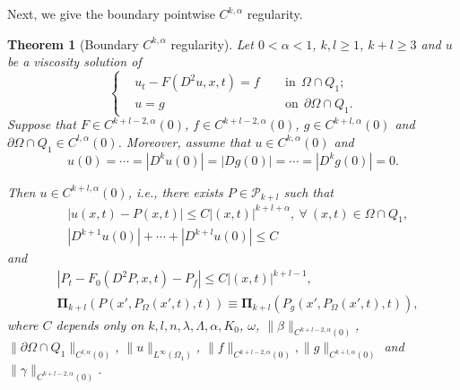 \documentclass[preprint,12pt]{elsarticle}
\newtheorem{theorem}{Theorem}[section]
\theoremstyle{definition}
\theoremstyle{remark}
\numberwithin{equation}{section}
\begin{document}
Next, we give the boundary pointwise $C^{k,\alpha}$ regularity.

\begin{theorem}[Boundary $C^{k,\alpha}$ regularity]\label{Ckla}
Let $0<\alpha<1$, $k,l\geq 1$, $k+l\geq 3$ and $u$ be a viscosity solution of
\begin{equation}\label{e.Ckla.1}
 \left\{ \begin{aligned}
&u_t-F(D^2 u,x,t)=f ~~&&\mbox{in}~~\Omega\cap Q_1;\\
&u=g ~~&&\mbox{on}~~\partial \Omega\cap Q_1.
 \end{aligned}\right.
\end{equation}
Suppose that $F\in C^{k+l-2,\alpha}(0)$, $f\in C^{k+l-2,\alpha}(0)$, $g\in C^{k+l,\alpha}(0)$ and $\partial \Omega\cap Q_1\in C^{l,\alpha}(0)$. Moreover, assume that $u\in C^{k,\alpha}(0)$ and
\begin{equation*}
u(0)=\cdots=|D^ku(0)|=|Dg(0)|=\cdots=|D^kg(0)|=0.
\end{equation*}

Then $u\in C^{k+l,\alpha}(0)$, i.e., there exists $P\in \mathcal{P}_{k+l}$ such that
\begin{equation*}
  \begin{aligned}
&|u(x,t)-P(x,t)|\leq C |(x,t)|^{k+l+\alpha},~\forall ~(x,t)\in \Omega\cap Q_{1},\\
&|D^{k+1}u(0)|+\cdots+|D^{k+l}u(0)|\leq C
  \end{aligned}
\end{equation*}
and
\begin{equation}\label{e1.2}
\begin{aligned}
&|P_t-F_0(D^2 P,x,t)-P_f|\leq C|(x,t)|^{k+l-1},\\
&\mathbf{\Pi}_{k+l}\left(P(x',P_{\Omega}(x',t),t)\right)\equiv
\mathbf{\Pi}_{k+l}\left(P_g(x',P_{\Omega}(x',t),t)\right),
\end{aligned}
\end{equation}
where $C$ depends only on $k,l,n,\lambda,\Lambda,\alpha,K_0$, $\omega$, $\|\beta\|_{C^{k+l-2,\alpha}(0)}$, $\|\partial \Omega\cap Q_1\|_{C^{l,\alpha}(0)}$, $\|u\|_{L^{\infty}(\Omega_1)}$, $\|f\|_{C^{k+l-2,\alpha}(0)}, \|g\|_{C^{k+l,\alpha}(0)}$ and  $\|\gamma\|_{C^{k+l-2,\alpha}(0)}$.
\end{theorem}
\end{document}
